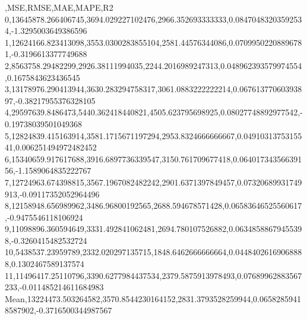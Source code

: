 ,MSE,RMSE,MAE,MAPE,R2
0,13645878.266406745,3694.029227102476,2966.352693333333,0.08470483203592534,-1.3295003649386596
1,12624166.823413098,3553.0300283855104,2581.44576344086,0.07099502208896781,-0.3196613377749688
2,8563758.29482299,2926.38111994035,2244.2016989247313,0.048962393579974554,0.1675843623436545
3,13178976.290413944,3630.283294758317,3061.0883222222214,0.06761377060393897,-0.38217955376328105
4,29597639.8486473,5440.362418440821,4505.623795698925,0.08027748892977542,-0.19738039501049368
5,12824839.415163914,3581.1715671197294,2953.8324666666667,0.0491031375315541,0.006251494972482452
6,15340659.917617688,3916.6897736339547,3150.761709677418,0.06401734356639156,-1.1589064835222767
7,12724963.674398815,3567.1967082482242,2901.6371397849457,0.07320689931749913,-0.09117352052964496
8,12158948.656989962,3486.96800192565,2688.594678571428,0.06583646525560617,-0.9475546118106924
9,11098896.360594649,3331.492841062481,2694.780107526882,0.06348588679455398,-0.3260415482532724
10,5438537.23959789,2332.020297135715,1848.6462666666664,0.04484026169068888,0.1302467589137574
11,11496417.25110796,3390.6277984437534,2379.5875913978493,0.07689962883567233,-0.011485214611684983
Mean,13224473.503264582,3570.8544230164152,2831.3793528259944,0.06582859418587902,-0.3716500344987567
